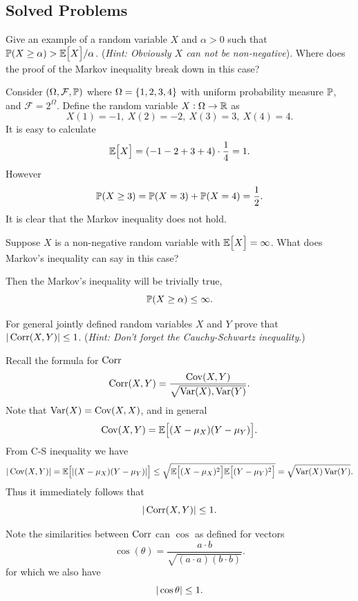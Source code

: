 \subsection{Solved Problems}
\begin{problem}
	Give an example of a random variable $ X $ and $ \alpha > 0 $ such that $ \mathbb{P}(X\geq\alpha) > \mathbb{E}\big[X\big]/\alpha $. (\emph{Hint: Obviously $ X $ can not be non-negative}). Where does the proof of the Markov inequality break down in this case?
\end{problem}
\begin{solution}
	Consider $ (\Omega,\mathcal{F},\mathbb{P}) $ where $ \Omega = \{1,2,3,4\} $ with uniform probability measure $ \mathbb{P} $, and $ \mathcal{F} = 2^\Omega $. Define the random variable $ X: \Omega \to \mathbb{R}$ as 
	\[ X(1) = -1,\ X(2)=-2,\ X(3)=3,\ X(4)=4. \]
	It is easy to calculate
	\[ \mathbb{E}\big[X\big] = (-1 -2 + 3 + 4) \cdot \frac{1}{4} = 1.  \]
	However
	\[ \mathbb{P}(X\geq 3) = \mathbb{P}(X = 3) + \mathbb{P}(X=4) = \frac{1}{2}. \]
	It is clear that the Markov inequality does not hold.
\end{solution}

\begin{problem}
	Suppose $ X $ is a non-negative random variable with $ \mathbb{E}\big[X\big] = \infty $. What does Markov's inequality can say in this case?
\end{problem}
\begin{solution}
	Then the Markov's inequality will be trivially true,
	\[ \mathbb{P}(X\geq\alpha) \leq \infty. \]
\end{solution}

\begin{problem}
	For general jointly defined random variables $ X $ and $ Y $ prove that $ |\operatorname{Corr}(X,Y)|\leq 1 $. (\emph{Hint: Don't forget the Cauchy-Schwartz inequality}.)
\end{problem}
\begin{solution}
	Recall the formula for $ \operatorname{Corr} $
	\[ \operatorname{Corr}(X,Y) = \frac{\operatorname{Cov}(X,Y)}{\sqrt{\operatorname{Var}(X),\operatorname{Var}(Y)}}. \]
	Note that $ \operatorname{Var}(X) = \operatorname{Cov}(X,X) $, and in general
	\[ \operatorname{Cov}(X,Y)=\mathbb{E}\big[(X-\mu_X)(Y-\mu_Y)\big]. \]
	From C-S inequality we have
	\[| \operatorname{Cov}(X,Y)| = \mathbb{E}\big[|(X-\mu_X)(Y-\mu_Y)|\big] \leq \sqrt{\mathbb{E}\big[(X-\mu_X)^2\big]\mathbb{E}\big[(Y-\mu_Y)^2\big]} = \sqrt{\operatorname{Var}(X) \operatorname{Var}(Y)}. \]
	Thus it immediately follows that 
	\[ |\operatorname{Corr}(X,Y)| \leq 1. \]
\end{solution}
\begin{remark}
	Note the similarities between $ \operatorname{Corr} $ can $ \cos $ as defined for vectors
	\[ \cos(\theta) = \frac{a \cdot b}{\sqrt{(a\cdot a)(b\cdot b)}}. \]
	for which we also have
	\[ |\cos\theta| \leq 1. \]
\end{remark}

